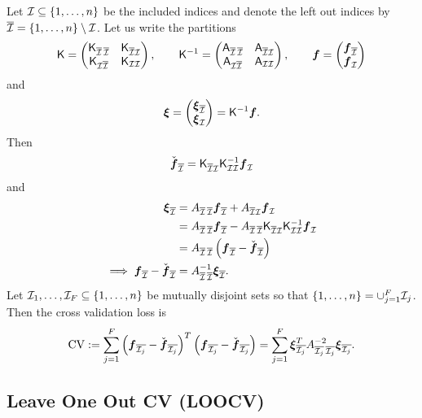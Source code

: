 \documentclass{amsart}
\begin{document}
Let $\ci \subseteq \{1,\dots,n\}$ be the included indices and denote the left out indices by $\overline{\ci} = \{1,\dots,n\} \setminus \ci$. Let us write the partitions
$$\mK = \begin{pmatrix} \mK_{\overline{\ci}\,\overline{\ci}}  & \mK_{\overline{\ci}\ci} \\ \mK_{\ci\overline{\ci}} & \mK_{\ci\ci} \end{pmatrix}, \qquad \mK^{-1} = \begin{pmatrix} \mA_{\overline{\ci}\,\overline{\ci}}  & \mA_{\overline{\ci}\ci} \\ \mA_{\ci\overline{\ci}} & \mA_{\ci\ci} \end{pmatrix}, \qquad \vf = \begin{pmatrix} \vf_{\overline{\ci}} \\ \vf_\ci \end{pmatrix}$$
and 
$$\vxi = \begin{pmatrix} \vxi_{\overline{\ci}} \\ \vxi_\ci\end{pmatrix} = \mK^{-1} \vf.$$
Then 
$$\check{\vf}_{\overline{\ci}} = \mK_{\overline{\ci} \ci} \mK_{\ci \ci}^{-1} \vf_\ci$$
and 
\begin{align*}
    \vxi_{\overline{\ci}} &= A_{\overline{\ci}\,\overline{\ci}} \vf_{\overline{\ci}} + A_{\overline{\ci}\ci} \vf_\ci \\
    &= A_{\overline{\ci}\,\overline{\ci}} \vf_{\overline{\ci}} - A_{\overline{\ci}\,\overline{\ci}} \mK_{\overline{\ci}\ci} \mK_{\ci \ci}^{-1} \vf_\ci \\
    &= A_{\overline{\ci}\,\overline{\ci}} \left(\vf_{\overline{\ci}} - \check{\vf}_{\overline{\ci}}\right) \\
    \implies \vf_{\overline{\ci}} - \check{\vf}_{\overline{\ci}} &= A_{\overline{\ci}\,\overline{\ci}}^{-1} \vxi_{\overline{\ci}}. 
\end{align*}
Let $\ci_1,\dots,\ci_F \subseteq \{1,\dots,n\}$ be mutually disjoint sets so that $\{1,\dots,n\} = \cup_{j=1}^F \ci_j$. Then the cross validation loss is 
$$\mathrm{CV} := \sum_{j=1}^F \left(\vf_{\overline{\ci_j}} - \check{\vf}_{\overline{\ci_j}}\right)^T \left(\vf_{\overline{\ci_j}} - \check{\vf}_{\overline{\ci_j}}\right) = \sum_{j=1}^F \vxi_{\overline{\ci_j}}^T A_{\overline{\ci_j}\,\overline{\ci_j}}^{-2} \vxi_{\overline{\ci_j}}.$$

\subsection{Leave One Out CV (LOOCV)} 
\end{document}
